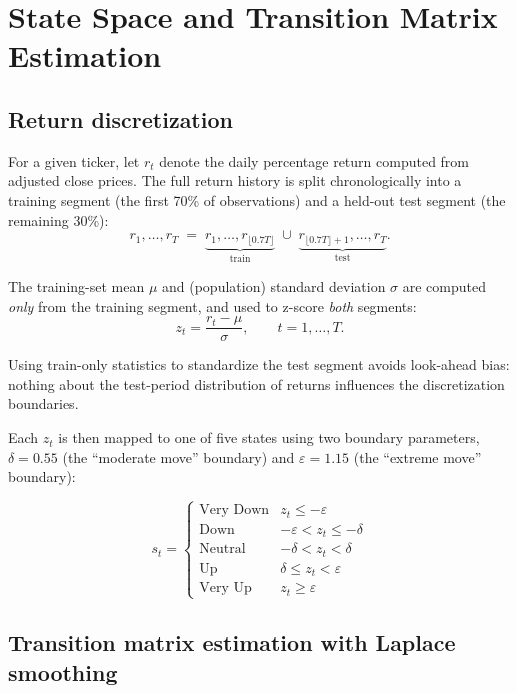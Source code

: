 \documentclass[11pt]{article}
\begin{document}
\section{State Space and Transition Matrix Estimation}

\subsection{Return discretization}

For a given ticker, let $r_t$ denote the daily percentage return computed
from adjusted close prices. The full return history is split
chronologically into a training segment (the first 70\% of observations)
and a held-out test segment (the remaining 30\%):
\[
  r_1, \dots, r_T \;=\; \underbrace{r_1, \dots, r_{\lfloor 0.7T \rfloor}}_{\text{train}}
  \;\cup\; \underbrace{r_{\lfloor 0.7T \rfloor + 1}, \dots, r_T}_{\text{test}}.
\]

The training-set mean $\mu$ and (population) standard deviation $\sigma$
are computed \emph{only} from the training segment, and used to z-score
\emph{both} segments:
\[
  z_t = \frac{r_t - \mu}{\sigma}, \qquad t = 1, \dots, T.
\]

Using train-only statistics to standardize the test segment avoids
look-ahead bias: nothing about the test-period distribution of returns
influences the discretization boundaries.

Each $z_t$ is then mapped to one of five states using two boundary
parameters, $\delta = 0.55$ (the ``moderate move'' boundary) and
$\varepsilon = 1.15$ (the ``extreme move'' boundary):

\[
  s_t =
  \begin{cases}
    \text{Very Down} & z_t \le -\varepsilon \\
    \text{Down}      & -\varepsilon < z_t \le -\delta \\
    \text{Neutral}   & -\delta < z_t < \delta \\
    \text{Up}        & \delta \le z_t < \varepsilon \\
    \text{Very Up}   & z_t \ge \varepsilon
  \end{cases}
\]

\subsection{Transition matrix estimation with Laplace smoothing}
\end{document}
